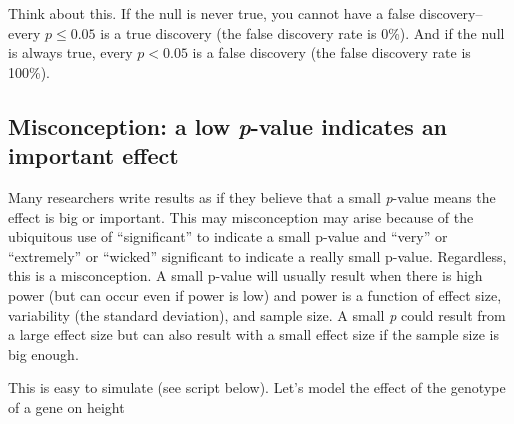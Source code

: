 \documentclass[]{book}
\newenvironment{Shaded}{\begin{snugshade}}{\end{snugshade}}
\newcommand{\DataTypeTok}[1]{\textcolor[rgb]{0.13,0.29,0.53}{#1}}
\newcommand{\DecValTok}[1]{\textcolor[rgb]{0.00,0.00,0.81}{#1}}
\newcommand{\FloatTok}[1]{\textcolor[rgb]{0.00,0.00,0.81}{#1}}
\newcommand{\KeywordTok}[1]{\textcolor[rgb]{0.13,0.29,0.53}{\textbf{#1}}}
\newcommand{\NormalTok}[1]{#1}
\newcommand{\OperatorTok}[1]{\textcolor[rgb]{0.81,0.36,0.00}{\textbf{#1}}}
\newcommand{\StringTok}[1]{\textcolor[rgb]{0.31,0.60,0.02}{#1}}
\begin{document}
Think about this. If the null is never true, you cannot have a false discovery--every \(p \le 0.05\) is a true discovery (the false discovery rate is 0\%). And if the null is always true, every \(p < 0.05\) is a false discovery (the false discovery rate is 100\%).

\hypertarget{misconception-a-low-p-value-indicates-an-important-effect}{%
\subsection{\texorpdfstring{Misconception: a low \emph{p}-value indicates an important effect}{Misconception: a low p-value indicates an important effect}}\label{misconception-a-low-p-value-indicates-an-important-effect}}

Many researchers write results as if they believe that a small \emph{p}-value means the effect is big or important. This may misconception may arise because of the ubiquitous use of ``significant'' to indicate a small p-value and ``very'' or ``extremely'' or ``wicked'' significant to indicate a really small p-value. Regardless, this is a misconception. A small p-value will usually result when there is high power (but can occur even if power is low) and power is a function of effect size, variability (the standard deviation), and sample size. A small \emph{p} could result from a large effect size but can also result with a small effect size if the sample size is big enough.

This is easy to simulate (see script below). Let's model the effect of the genotype of a gene on height

\begin{Shaded}
\end{Shaded}
\end{document}
